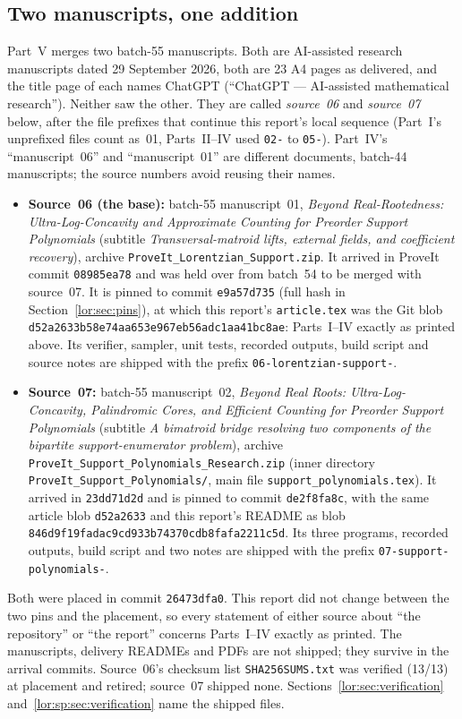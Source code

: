 \documentclass[11pt]{article}
\numberwithin{equation}{section}
\theoremstyle{definition}
\begin{document}
\subsection{Two manuscripts, one addition}
\label{lor:sec:source}
Part~V merges two batch-55 manuscripts. Both are AI-assisted research
manuscripts dated 29 September 2026, both are 23 A4 pages as delivered, and
the title page of each names ChatGPT (``ChatGPT --- AI-assisted mathematical
research''). Neither saw the other. They are called \emph{source~06} and
\emph{source~07} below, after the file prefixes that continue this report's
local sequence (Part~I's unprefixed files count as~01, Parts~II--IV used
\texttt{02-} to \texttt{05-}). Part~IV's ``manuscript~06'' and
``manuscript~01'' are different documents, batch-44 manuscripts; the
source numbers avoid reusing their names.
\begin{itemize}[leftmargin=1.4em]
\item \textbf{Source~06 (the base):} batch-55 manuscript~01, \emph{Beyond
Real-Rootedness: Ultra-Log-Concavity and Approximate Counting for Preorder
Support Polynomials} (subtitle \emph{Transversal-matroid lifts, external
fields, and coefficient recovery}), archive
\nolinkurl{ProveIt_Lorentzian_Support.zip}. It arrived in ProveIt commit
\texttt{08985ea78} and was held over from batch~54 to be merged with
source~07. It is pinned to commit \texttt{e9a57d735} (full hash in
Section~\ref{lor:sec:pins}), at which this report's \texttt{article.tex} was
the Git blob \texttt{d52a2633b58e74aa653e\allowbreak 967eb56adc1aa41bc8ae}:
Parts~I--IV exactly as printed above. Its verifier, sampler, unit tests,
recorded outputs, build script and source notes are shipped with the prefix
\texttt{06-lorentzian-support-}.
\item \textbf{Source~07:} batch-55 manuscript~02, \emph{Beyond Real Roots:
Ultra-Log-Concavity, Palindromic Cores, and Efficient Counting for Preorder
Support Polynomials} (subtitle \emph{A bimatroid bridge resolving two
components of the bipartite support-enumerator problem}), archive
\nolinkurl{ProveIt_Support_Polynomials_Research.zip} (inner directory
\nolinkurl{ProveIt_Support_Polynomials/}, main file
\nolinkurl{support_polynomials.tex}). It arrived in \texttt{23dd71d2d} and is
pinned to commit \texttt{de2f8fa8c}, with the same article blob
\texttt{d52a2633} and this report's README as blob
\texttt{846d9f19fadac9cd933b\allowbreak 74370cdb8fafa2211c5d}. Its three
programs, recorded outputs, build script and two notes are shipped with the
prefix \texttt{07-support-polynomials-}.
\end{itemize}
Both were placed in commit \texttt{26473dfa0}. This report did not change
between the two pins and the placement, so every statement of either source
about ``the repository'' or ``the report'' concerns Parts~I--IV exactly as
printed. The manuscripts, delivery READMEs and PDFs are not shipped; they
survive in the arrival commits. Source~06's checksum list
\texttt{SHA256SUMS.txt} was verified (13/13) at placement and retired;
source~07 shipped none. Sections~\ref{lor:sec:verification}
and~\ref{lor:sp:sec:verification} name the shipped files.
\end{document}
